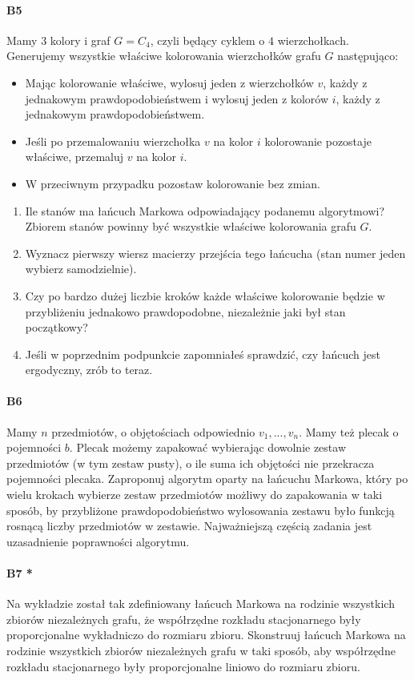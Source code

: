 \documentclass[a4paper,12pt]{article}
\theoremstyle{definition}%
\theoremstyle{definition}
\theoremstyle{problem}
\begin{document}
\paragraph{B5} Mamy $3$ kolory i graf $G = C_4$, czyli będący cyklem o $4$ wierzchołkach. Generujemy wszystkie właściwe kolorowania wierzchołków grafu $G$ następująco:
\begin{itemize}
\item Mając kolorowanie właściwe, wylosuj jeden z wierzchołków $v$, każdy z jednakowym prawdopodobieństwem i wylosuj jeden z kolorów $i$, każdy z jednakowym prawdopodobieństwem.
\item Jeśli po przemalowaniu wierzchołka $v$ na kolor $i$ kolorowanie pozostaje właściwe, przemaluj $v$ na kolor $i$.
\item W przeciwnym przypadku pozostaw kolorowanie bez zmian.
\end{itemize}
\begin{enumerate}[label=\alph*)]
\item Ile stanów ma łańcuch Markowa odpowiadający podanemu algorytmowi? Zbiorem stanów powinny być
wszystkie właściwe kolorowania grafu $G$.
\item Wyznacz pierwszy wiersz macierzy przejścia tego łańcucha (stan numer jeden wybierz samodzielnie).
\item Czy po bardzo dużej liczbie kroków każde właściwe kolorowanie będzie w przybliżeniu jednakowo prawdopodobne, niezależnie jaki był stan początkowy?
\item Jeśli w poprzednim podpunkcie zapomniałeś sprawdzić, czy łańcuch jest ergodyczny, zrób to teraz.
\end{enumerate}


\paragraph{B6} Mamy $n$ przedmiotów, o objętościach odpowiednio $v_1, . . . , v_n$. Mamy też plecak o pojemności $b$. Plecak możemy zapakować wybierając dowolnie zestaw przedmiotów (w tym zestaw pusty), o ile suma ich objętości nie przekracza pojemności plecaka. Zaproponuj algorytm oparty na łańcuchu Markowa, który po wielu krokach wybierze zestaw przedmiotów możliwy do zapakowania w taki sposób, by przybliżone prawdopodobieństwo wylosowania zestawu było funkcją rosnącą liczby przedmiotów w zestawie. Najważniejszą częścią zadania jest uzasadnienie poprawności algorytmu.

\paragraph{B7 *} Na wykładzie został tak zdefiniowany łańcuch Markowa na rodzinie wszystkich zbiorów niezależnych grafu, że współrzędne rozkładu stacjonarnego były proporcjonalne wykładniczo do rozmiaru zbioru. Skonstruuj łańcuch Markowa na rodzinie wszystkich zbiorów niezależnych grafu w taki sposób, aby współrzędne rozkładu stacjonarnego były proporcjonalne liniowo do rozmiaru zbioru.
\end{document}
